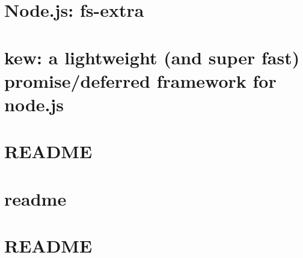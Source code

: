 \documentclass[twoside]{book}
\newcommand{\+}{\discretionary{\mbox{\scriptsize$\hookleftarrow$}}{}{}}
\begin{document}
\chapter{Node.\+js\+: fs-\/extra}
\label{md__c_1__users_martin__documents__git_hub_visual_studio__bachelor__wis_r__wis_r_node_modules_gru24cec1de65225ba8a26324bf556f0060}
\hypertarget{md__c_1__users_martin__documents__git_hub_visual_studio__bachelor__wis_r__wis_r_node_modules_gru24cec1de65225ba8a26324bf556f0060}{}

\chapter{kew\+: a lightweight (and super fast) promise/deferred framework for node.\+js}
\label{md__c_1__users_martin__documents__git_hub_visual_studio__bachelor__wis_r__wis_r_node_modules_gru79f560a8497410ea62787df48cf60a5f}
\hypertarget{md__c_1__users_martin__documents__git_hub_visual_studio__bachelor__wis_r__wis_r_node_modules_gru79f560a8497410ea62787df48cf60a5f}{}

\chapter{R\+E\+A\+D\+M\+E}
\label{md__c_1__users_martin__documents__git_hub_visual_studio__bachelor__wis_r__wis_r_node_modules_grucb6a465f15df79270ff1326cb5fd414d}
\hypertarget{md__c_1__users_martin__documents__git_hub_visual_studio__bachelor__wis_r__wis_r_node_modules_grucb6a465f15df79270ff1326cb5fd414d}{}

\chapter{readme}
\label{md__c_1__users_martin__documents__git_hub_visual_studio__bachelor__wis_r__wis_r_node_modules_grud2c078d51caabace76d9fc9fcc2197a7}
\hypertarget{md__c_1__users_martin__documents__git_hub_visual_studio__bachelor__wis_r__wis_r_node_modules_grud2c078d51caabace76d9fc9fcc2197a7}{}

\chapter{R\+E\+A\+D\+M\+E}
\label{md__c_1__users_martin__documents__git_hub_visual_studio__bachelor__wis_r__wis_r_node_modules_gru80eac2d1f42cc454c0161be7eb36f396}
\hypertarget{md__c_1__users_martin__documents__git_hub_visual_studio__bachelor__wis_r__wis_r_node_modules_gru80eac2d1f42cc454c0161be7eb36f396}{}

\end{document}

